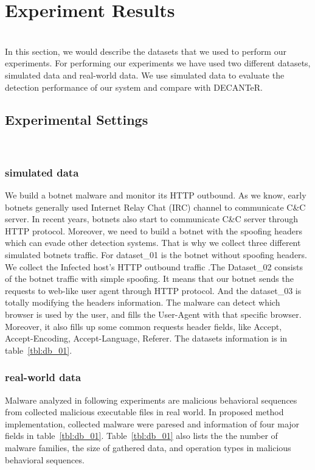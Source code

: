 \section{Experiment Results}

{\color{red}{Tony, pliz write overview here!!!}} \\
In this section, we would describe the datasets that we used to perform our experiments. For performing our experiments we have used two different datasets, simulated data and real-world data. We use simulated data to evaluate the detection performance of our system and compare with DECANTeR. \\


\subsection{Experimental Settings}

{\color{red}{Tony, pliz write like the followings in this subsection!}}\\

\subsubsection{simulated data} 
We build a botnet malware and monitor its HTTP outbound. As we know, early botnets generally used Internet Relay Chat (IRC) channel to communicate C\&C server. In recent years, botnets also start to communicate C\&C server through HTTP protocol. Moreover, we need to build a botnet with the spoofing headers which can evade other detection systems. That is why we collect three different simulated botnets traffic. For dataset\_01 is the botnet without spoofing headers. We collect the Infected host's HTTP outbound traffic .The Dataset\_02 consists of the botnet traffic with simple spoofing. It means that our botnet sends the requests to web-like user agent through HTTP protocol. And the dataset\_03 is totally modifying the headers information. The malware can detect which browser is used by the user, and fills the User-Agent with that specific browser. Moreover, it also fills up some common requests header fields, like Accept, Accept-Encoding, Accept-Language, Referer. The datasets information is in table~\ref{tbl:db_01}.

\subsubsection{real-world data}

Malware analyzed in following experiments are malicious behavioral sequences from collected malicious executable files in real world.  In proposed method implementation, collected malware were paresed and information of four major fields in table~\ref{tbl:db_01}. Table~\ref{tbl:db_01} also lists the the number of malware families, the size of gathered data, and operation types in malicious behavioral sequences. 


